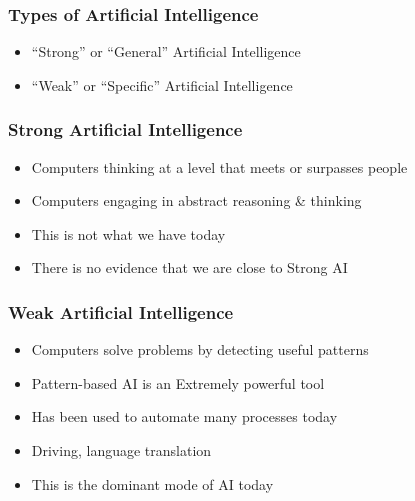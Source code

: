 


\begin{frame}[fragile]\frametitle{Types of Artificial Intelligence}
\begin{itemize}
\item  ``Strong'' or ``General'' Artificial Intelligence
\item  ``Weak'' or ``Specific'' Artificial Intelligence
\end{itemize}
\end{frame}

\begin{frame}[fragile]\frametitle{Strong Artificial Intelligence}
\begin{itemize}
\item   Computers thinking at a level that meets or surpasses people
\item   Computers engaging in abstract reasoning \& thinking
\item   This is not what we have today
\item   There is no evidence that we are close to Strong AI
\end{itemize}
\end{frame}

\begin{frame}[fragile]\frametitle{Weak Artificial Intelligence}
\begin{itemize}
\item   Computers solve problems by detecting useful patterns
\item   Pattern-based AI is an Extremely powerful tool 
\item   Has been used to automate many processes today
\item   Driving, language translation
\item   This is the dominant mode of AI today
\end{itemize}
\end{frame}


